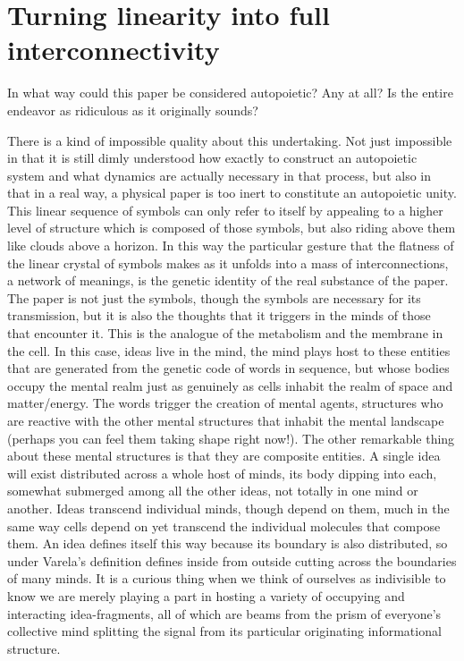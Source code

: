\documentclass[12pt]{scrartcl}
\begin{document}
\section{Turning linearity into full interconnectivity}

In what way could this paper be considered autopoietic?  Any at all?  Is the entire endeavor as ridiculous as it originally sounds?

There is a kind of impossible quality about this undertaking.  Not just impossible in that it is still dimly understood how exactly to construct an autopoietic system and what dynamics are actually necessary in that process, but also in that in a real way, a physical paper is too inert to constitute an autopoietic unity.  This linear sequence of symbols can only refer to itself by appealing to a higher level of structure which is composed of those symbols, but also riding above them like clouds above a horizon.  In this way the particular gesture that the flatness of the linear crystal of symbols makes as it unfolds into a mass of interconnections, a network of meanings, is the genetic identity of the real substance of the paper.  The paper is not just the symbols, though the symbols are necessary for its transmission, but it is also the thoughts that it triggers in the minds of those that encounter it.  This is the analogue of the metabolism and the membrane in the cell.  In this case, ideas live in the mind, the mind plays host to these entities that are generated from the genetic code of words in sequence, but whose bodies occupy the mental realm just as genuinely as cells inhabit the realm of space and matter/energy.  The words trigger the creation of mental agents, structures who are reactive with the other mental structures that inhabit the mental landscape (perhaps you can feel them taking shape right now!).  The other remarkable thing about these mental structures is that they are composite entities.  A single idea will exist distributed across a whole host of minds, its body dipping into each, somewhat submerged among all the other ideas, not totally in one mind or another.  Ideas transcend individual minds, though depend on them, much in the same way cells depend on yet transcend the individual molecules that compose them.  An idea defines itself this way because its boundary is also distributed, so under Varela's definition defines inside from outside cutting across the boundaries of many minds.  It is a curious thing when we think of ourselves as indivisible to know we are merely playing a part in hosting a variety of occupying and interacting idea-fragments, all of which are beams from the prism of everyone's collective mind splitting the signal from its particular originating informational structure.  
\end{document}
